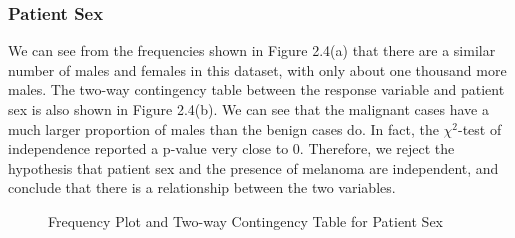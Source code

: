 \documentclass [MAS] {uclathes}
\begin{document}
\subsubsection*{Patient Sex}

We can see from the frequencies shown in Figure 2.4(a) that there are a similar number of males and females in this dataset, with only about one thousand more males. The two-way contingency table between the response variable and patient sex is also shown in Figure 2.4(b). We can see that the malignant cases have a much larger proportion of males than the benign cases do. In fact, the $\chi^2$-test of independence reported a p-value very close to 0. Therefore, we reject the hypothesis that patient sex and the presence of melanoma are independent, and conclude that there is a relationship between the two variables.

\begin{figure}[hbt!]
    \hspace*{\fill}
    \centering
    \hspace{1em}
    \hspace*{\fill}
    \label{fig:sex_eda_tab}
    \vspace{0cm}
    \caption{Frequency Plot and Two-way Contingency Table for Patient Sex}
    \end{figure}
\end{document}
